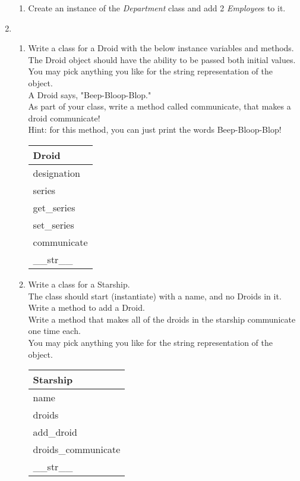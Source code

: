 \documentclass{article}
\begin{document}
\begin{enumerate}
\begin{enumerate}
		\item
			Create an instance of the \textit{Department} class and add 2 \textit{Employee}s to it.
	\end{enumerate}
\pagebreak


	\item
	\begin{enumerate}
		\item
			Write a class for a Droid with the below instance variables and methods.\\ 
			The Droid object should have the ability to be passed both initial values.\\  
			You may pick anything you like for the string representation of the object.\\
			A Droid says, "Beep-Bloop-Blop."\\  
			As part of your class, write a method called communicate, that makes a droid communicate!\\
			Hint: for this method, you can just print the words Beep-Bloop-Blop!
			\begin{flushright}
			\begin{tabular}{|l|}
				\hline
				Droid\\ \hline
				designation\\	series\\	 \hline
				get\_series \\ set\_series \\ communicate \\ \_\_str\_\_ \\ \hline
			\end{tabular}
			\end{flushright}

		\item
			Write a class for a Starship. \\
			The class should start (instantiate) with a name, and no Droids in it. \\ 
			Write a method to add a Droid.\\
			Write a method that makes all of the droids in the starship communicate one time each.\\
			You may pick anything you like for the string representation of the object.
	
			\begin{flushright}
			\begin{tabular}{|l|}
				\hline
				Starship\\ \hline  	%
				name\\ droids\\ \hline		%
				add\_droid\\ droids\_communicate \\ \_\_str\_\_ \\ \hline		%
			\end{tabular}
			\end{flushright}


\end{enumerate}
\end{enumerate}
\end{document}

